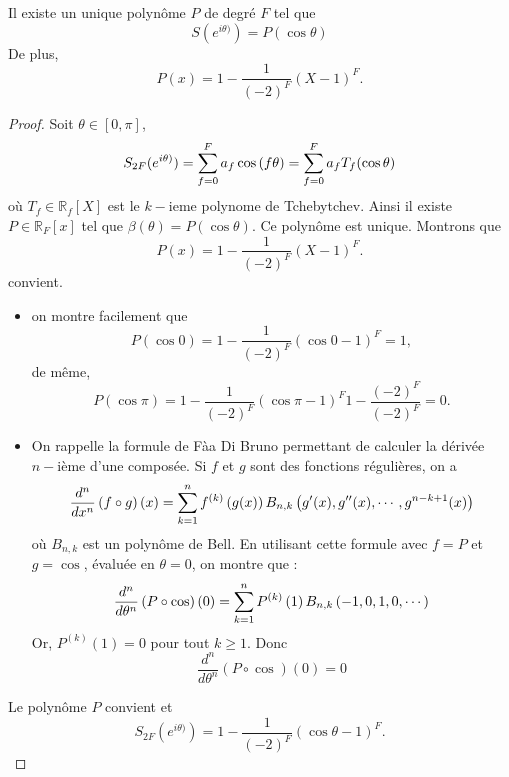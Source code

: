 \begin{proposition}
Il existe un unique polynôme $P$ de degré $F$ tel que 
\begin{equation}
S(e^{i\theta)}) = P(\cos \theta )
\end{equation}
De plus,
\begin{equation}
P(x) = 1 -\dfrac{1}{(-2)^F} (X - 1)^F.
\end{equation}
\end{proposition}

\begin{proof}
Soit $\theta \in [0, \pi]$, 
\begin{equation}
S_{2F}(e^{i\theta)}) = \displaystyle\sum\limits_{f=0}^F a_f \cos \left( f \theta \right) = \displaystyle\sum\limits_{f=0}^F a_f T_f ( \cos \theta )
\end{equation}
où $T_f \in \mathbb{R}_f [X]$ est le $k-$ieme polynome de Tchebytchev. 
Ainsi il existe $P \in \mathbb{R}_F [x]$ tel que $\beta( \theta ) = P( \cos \theta )$. Ce polynôme est unique. Montrons que 
\begin{equation}
P(x) = 1 -\dfrac{1}{(-2)^F} (X - 1)^F.
\end{equation}
convient.

\begin{itemize}
\item on montre facilement que 
\begin{equation}
P( \cos 0 ) = 1 -\dfrac{1}{(-2)^F} (\cos 0 - 1)^F = 1,
\end{equation}
de même,
\begin{equation}
P( \cos \pi ) = 1 -\dfrac{1}{(-2)^F} (\cos \pi - 1)^F 1 -\dfrac{(-2)^F}{(-2)^F} = 0.
\end{equation}
\item On rappelle la formule de Fàa Di Bruno permettant de calculer la dérivée $n-$ième d'une composée. Si $f$ et $g$ sont des fonctions régulières, on a 
\begin{equation}
\dfrac{d^n}{dx^n} \left( f \circ g \right)(x) = \displaystyle\sum\limits_{k=1}^n f^{(k)}\left( g(x) \right) B_{n,k}\left( g'(x), g''(x), \cdots , g^{n-k+1}(x) \right)
\end{equation}
où $B_{n,k}$ est un polynôme de Bell. En utilisant cette formule avec $f = P$ et $g = \cos$, évaluée en $\theta = 0$, on montre que :
\begin{equation}
\dfrac{d^n}{d\theta^n} \left( P \circ \cos \right)(0) = \displaystyle\sum\limits_{k=1}^n P^{(k)}\left(1\right) B_{n,k}\left( -1,0,1,0, \cdots\right)
\end{equation}
Or, $P^{(k)}\left(1\right) = 0$ pour tout $k \geq 1$. Donc 
\begin{equation}
\dfrac{d^n}{d\theta^n} \left( P \circ \cos \right)(0) = 0
\end{equation}
\end{itemize}
Le polynôme $P$ convient et 
\begin{equation}
S_{2F}(e^{i\theta)}) = 1 - \dfrac{1}{(-2)^F}(\cos \theta -1)^F.
\end{equation}
\end{proof}

